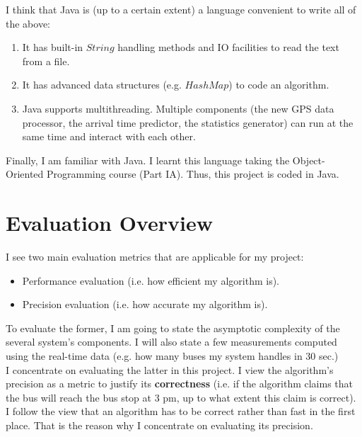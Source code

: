 \documentclass[12pt,a4paper,oneside,openright]{report}
\begin{document}
I think that Java is (up to a certain extent) a language convenient to write all of the above:

\begin{enumerate}
\item It has built-in $String$ handling methods and IO facilities to read the text from a file.
\item It has advanced data structures (e.g. $HashMap$) to code an algorithm.
\item Java supports multithreading. Multiple components (the new GPS data processor, the arrival time
      predictor, the statistics generator) can run at the same time and interact with each other.
\end{enumerate}

Finally, I am familiar with Java. I learnt this language taking the Object-Oriented Programming course (Part IA).
Thus, this project is coded in Java.

\newpage 

\section{Evaluation Overview}

I see two main evaluation metrics that are applicable for my project:

\begin{itemize}

\item Performance evaluation (i.e. how efficient my algorithm is).

\item Precision evaluation (i.e. how accurate my algorithm is).

\end{itemize}

To evaluate the former, I am going to state the asymptotic complexity of the several
system's components. I will also state a few measurements computed using the
real-time data (e.g. how many buses my system handles in 30 sec.) \\

I concentrate on evaluating the latter in this project. I view the algorithm's precision as
a metric to justify its \textbf{correctness} (i.e. if the algorithm claims that the bus will reach the bus stop at 3 pm, up to what extent this claim is correct). I follow the view that an algorithm has
to be correct rather than fast in the first place. That is the reason why I concentrate
on evaluating its precision. \\
\end{document}
